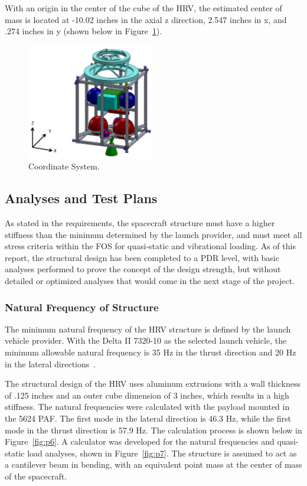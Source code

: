 \documentclass[paper=letter, fontsize=11pt]{scrartcl} %
\numberwithin{equation}{section} %
\numberwithin{figure}{section} %
\numberwithin{table}{section} %
\begin{document}
With an origin in the center of the cube of the HRV, the estimated center of mass is located at -10.02 inches in the axial z direction, 2.547 inches in x, and .274 inches in y (shown below in Figure~\ref{fig:p5}).

\begin{figure}[H]
    \begin{center}
    \includegraphics[width=0.5\textwidth]{Pics/5.png}
    \caption{Coordinate System.}
    \label{fig:p5}
    \end{center}
\end{figure}

\subsection{Analyses and Test Plans}
As stated in the requirements, the spacecraft structure must have a higher stiffness than the minimum determined by the launch provider, and must meet all stress criteria within the FOS for quasi-static and vibrational loading. As of this report, the structural design has been completed to a PDR level, with basic analyses performed to prove the concept of the design strength, but without detailed or optimized analyses that would come in the next stage of the project.

\subsubsection{Natural Frequency of Structure}
The minimum natural frequency of the HRV structure is defined by the launch vehicle provider. With the Delta II 7320-10 as the selected launch vehicle, the minimum allowable natural frequency is 35 Hz in the thrust direction and 20 Hz in the lateral directions~\cite{delta2}.

The structural design of the HRV uses aluminum extrusions with a wall thickness of .125 inches and an outer cube dimension of 3 inches, which results in a high stiffness. The natural frequencies were calculated with the payload mounted in the 5624 PAF. The first mode in the lateral direction is 46.3 Hz, while the first mode in the thrust direction is 57.9 Hz. The calculation process is shown below in Figure~\ref{fig:p6}. A calculator was developed for the natural frequencies and quasi-static load analyses, shown in Figure~\ref{fig:p7}. The structure is assumed to act as a cantilever beam in bending, with an equivalent point mass at the center of mass of the spacecraft.
\end{document}
